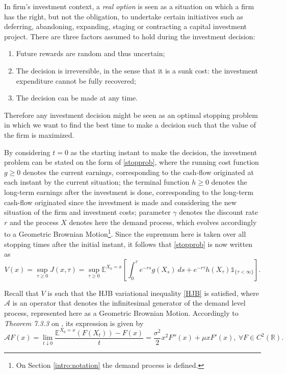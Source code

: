 In firm's investment context, a \textit{real option} is seen as a situation on which a firm has the right, but not the obligation, to undertake certain initiatives such as deferring, abandoning, expanding, staging or contracting a capital investment project. There are three factors assumed to hold during the investment decision:
\begin{enumerate}
	\item Future rewards are random and thus uncertain;
	\item The decision is irreversible, in the sense that it is a sunk cost: the investment expenditure cannot be fully recovered;
	\item The decision can be made at any time.
\end{enumerate}

Therefore any investment decision might be seen as an optimal stopping problem in which we want to find the best time to make a decision such that the value of the firm is maximized.

By considering $t=0$ as the starting instant to make the decision, the investment problem can be stated on the form of \eqref{stopprob}, where the running cost function $g\geq0$ denotes the current earnings, corresponding to the cash-flow originated at each instant by the current situation; the terminal function $h\geq0$ denotes the long-term earnings after the investment is done, corresponding to the long-term cash-flow originated since the investment is made and considering the new situation of the firm and investment costs; parameter $\gamma$ denotes the discount rate $r$ and the process $X$ denotes here the demand process, which evolves accordingly to a Geometric Brownian Motion\footnote{On Section \ref{intro:notation} the demand process is defined.}. Since the supremum here is taken over all stopping times after the initial instant, it follows that \eqref{stopprob} is now written as
\begin{equation}
V(x)=\sup_{\tau \geq 0} J(x,\tau)=\sup_{\tau \geq 0} \mathds{E}^{X_0=x}\left[ \int^\tau_0 e^{-r s} g(X_s) \ ds +e^{-r \tau}h(X_\tau) \mathds{1}_{ \{\tau< \infty \}} \right].
	\label{stopprob2}
\end{equation}

Recall that $V$ is such that the HJB variational inequality \eqref{HJB} is satisfied, where $\mathcal{A}$ is an operator that denotes the infinitesimal generator of the demand level process, represented here as a Geometric Brownian Motion. Accordingly to \textit{Theorem 7.3.3} on \cite{oksendal:book}, its expression is given by 
\begin{equation}
\mathcal{A}F(x)=
\lim_{t\downarrow 0} \frac{\mathds{E}^{X_0=x}(F(X_t))-F(x)}{t}=
\frac{\sigma^2}{2}x^2F''(x)+\mu x F'(x), \ \forall F \in C^2(\mathds{R}).
\label{eq:Lgbm}
\end{equation}

